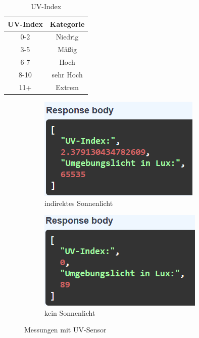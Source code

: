 \vspace{2mm}
\begin{table}[h]
    \centering
    \begin{tabular}{ | c | c | } 
  \hline
   UV-Index & Kategorie\\ 
  \hline
   0-2 & Niedrig\\ 
  \hline
   3-5 & Mäßig \\ 
  \hline
   6-7 & Hoch \\ 
  \hline
   8-10 & sehr Hoch \\ 
  \hline
   11+ & Extrem \\ 
  \hline
\end{tabular}
    \caption{UV-Index}
\end{table}

\begin{figure}[H]
    \centering
    \begin{subfigure}[b]{0.45\textwidth}
        \centering
        \includegraphics[width=\textwidth]{image/UVsensor hell.png}
        \caption{indirektes Sonnenlicht}
        \label{fig:bild1}
    \end{subfigure}
    \hfill
    \begin{subfigure}[b]{0.45\textwidth}
        \centering
        \includegraphics[width=\textwidth]{image/uvsensor dunkel.png}
        \caption{kein Sonnenlicht}
        \label{fig:bild2}
    \end{subfigure}
    \caption{Messungen mit UV-Sensor}
    \label{fig:zwei_bilder}
\end{figure}
